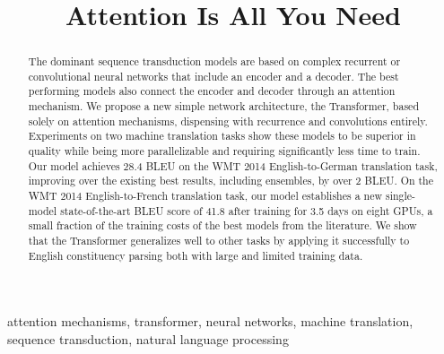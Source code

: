 \documentclass[conference]{IEEEtran}
\begin{document}
\title{Attention Is All You Need}

\author{
}

\maketitle

\begin{abstract}
The dominant sequence transduction models are based on complex recurrent or convolutional neural networks that include an encoder and a decoder. The best performing models also connect the encoder and decoder through an attention mechanism. We propose a new simple network architecture, the Transformer, based solely on attention mechanisms, dispensing with recurrence and convolutions entirely. Experiments on two machine translation tasks show these models to be superior in quality while being more parallelizable and requiring significantly less time to train. Our model achieves 28.4 BLEU on the WMT 2014 English-to-German translation task, improving over the existing best results, including ensembles, by over 2 BLEU. On the WMT 2014 English-to-French translation task, our model establishes a new single-model state-of-the-art BLEU score of 41.8 after training for 3.5 days on eight GPUs, a small fraction of the training costs of the best models from the literature. We show that the Transformer generalizes well to other tasks by applying it successfully to English constituency parsing both with large and limited training data.
\end{abstract}

\begin{IEEEkeywords}
attention mechanisms, transformer, neural networks, machine translation, sequence transduction, natural language processing
\end{IEEEkeywords}
\end{document}
